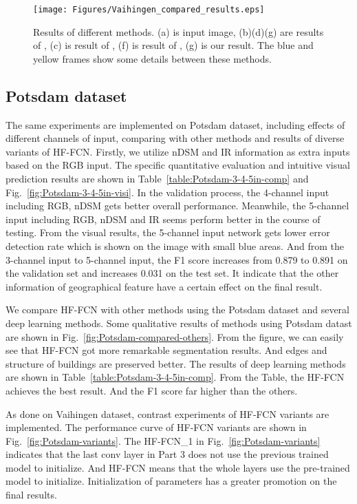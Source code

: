 \begin{figure}
\setlength{\abovecaptionskip}{-0cm}
\setlength{\belowcaptionskip}{-1cm}  
\centering
\texttt{[image: Figures/Vaihingen\_compared\_results.eps]}
\caption{Results of different methods. (a) is input image, (b)(d)(g) are results of \cite{IEEEexample:audebert2017deep}, (c) is result of \cite{IEEEexample:marmanis2016semantic}, (f) is result of \cite{IEEEexample:unknown}, (g) is our result. The blue and yellow frames show some details between these methods.}
\label{fig:Vaihingen-compared-others}
\end{figure}

\subsection{Potsdam dataset}
 The same experiments are implemented on Potsdam dataset, including effects of different channels of input, comparing with other methods and results of diverse variants of HF-FCN. Firstly, we utilize nDSM and IR information as extra inputs based on the RGB input. The specific quantitative evaluation and intuitive visual prediction results are shown in Table~\ref{table:Potsdam-3-4-5in-comp} and Fig.~\ref{fig:Potsdam-3-4-5in-visi}. In the validation process, the 4-channel input including RGB, nDSM gets better overall performance. Meanwhile, the 5-channel input including RGB, nDSM and IR seems perform better in the course of testing. From the visual results, the 5-channel input network gets lower error detection rate which is shown on the image with small blue areas. And from the 3-channel input to 5-channel input, the F1 score increases from 0.879 to 0.891 on the validation set and increases 0.031 on the test set. It indicate that the other information of geographical feature have a certain effect on the final result.

 We compare HF-FCN with other methods using the Potsdam dataset and several deep learning methods. Some qualitative results of methods using Potsdam datast are shown in Fig.~\ref{fig:Potsdam-compared-others}.
 From the figure, we can easily see that HF-FCN got more remarkable segmentation results. And edges and structure of buildings are preserved better. The results of deep learning methods are shown in Table~\ref{table:Potsdam-3-4-5in-comp}. From the Table, the HF-FCN achieves the best result. And the F1 score far higher than the others.  

 As done on Vaihingen dataset, contrast experiments of HF-FCN variants are implemented. The performance curve of HF-FCN variants are shown in Fig.~\ref{fig:Potsdam-variants}.
 The HF-FCN\_1 in Fig.~\ref{fig:Potsdam-variants} indicates that the last conv layer in Part 3 does not use the previous trained model to initialize. And HF-FCN means that the whole layers use the pre-trained model to initialize. Initialization of parameters has a greater promotion on the final results.

